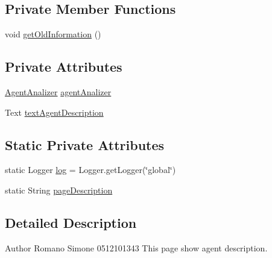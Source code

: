 \subsection*{Private Member Functions}
\begin{DoxyCompactItemize}
\item 
void \hyperlink{classit_1_1isislab_1_1masonhelperdocumentation_1_1mason_1_1wizards_1_1_d___agent_description_page_aa774dfe04837b0b796d9e292aa3935be}{get\-Old\-Information} ()
\end{DoxyCompactItemize}
\subsection*{Private Attributes}
\begin{DoxyCompactItemize}
\item 
\hyperlink{classit_1_1isislab_1_1masonhelperdocumentation_1_1analizer_1_1_agent_analizer}{Agent\-Analizer} \hyperlink{classit_1_1isislab_1_1masonhelperdocumentation_1_1mason_1_1wizards_1_1_d___agent_description_page_a2a9e05cc43fedb16d75050620d30f712}{agent\-Analizer}
\item 
Text \hyperlink{classit_1_1isislab_1_1masonhelperdocumentation_1_1mason_1_1wizards_1_1_d___agent_description_page_adeaf5a5649c9280ceb38690357c70a1b}{text\-Agent\-Description}
\end{DoxyCompactItemize}
\subsection*{Static Private Attributes}
\begin{DoxyCompactItemize}
\item 
static Logger \hyperlink{classit_1_1isislab_1_1masonhelperdocumentation_1_1mason_1_1wizards_1_1_d___agent_description_page_a52b31094ea4448637dde4a4fe4599a22}{log} = Logger.\-get\-Logger(\char`\"{}global\char`\"{})
\item 
static String \hyperlink{classit_1_1isislab_1_1masonhelperdocumentation_1_1mason_1_1wizards_1_1_d___agent_description_page_a8ba359bbeadb34933a78f865581fdf15}{page\-Description}
\end{DoxyCompactItemize}


\subsection{Detailed Description}
\begin{DoxyAuthor}{Author}
Romano Simone 0512101343 This page show agent description. 
\end{DoxyAuthor}


